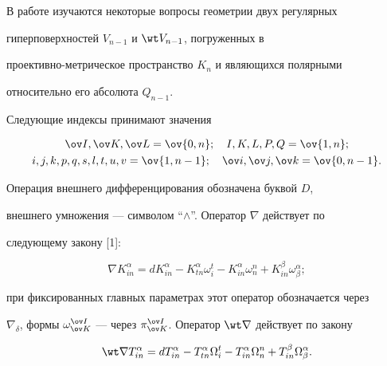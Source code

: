 \label{begin} 


 


 


В работе изучаются некоторые вопросы геометрии двух регулярных 


гиперповерхностей $V_{n-1}$ и $\wt V_{n-1}$, погруженных в 


проективно-метрическое пространство $K_n$ и являющихся полярными 


относительно его абсолюта $Q_{n-1}$. 


 


Следующие индексы принимают значения 


\begin{gather*} 


\ov I,\ov K,\ov L=\ov{0,n};\quad I,K,L,P,Q=\ov{1,n};\\ 


i,j,k,p,q,s,l,t,u,v=\ov{1,n-1};\quad 


\ov i,\ov j,\ov k=\ov{0,n-1}. 


\end{gather*} 


 


Операция внешнего дифференцирования обозначена буквой $D$, 


внешнего умножения --- символом ``$\wedge$''. Оператор $\nabla$ действует по 


следующему закону [1]: 


$$ 


\nabla K^\alpha_{in}=d K^\alpha_{in}-K^\alpha_{tn} 


\omega^t_i-K^\alpha_{in}\omega^n_n+K^\beta_{in} 


\omega^\alpha_\beta; 


$$ 


при фиксированных главных параметрах этот оператор обозначается через 


$\nabla_\delta$, формы $\omega^{\ov I}_{\ov K}$ --- через $\pi^{\ov I}_{\ov 


K}$. Оператор $\wt\nabla$ действует по закону 


$$ 


\wt\nabla T^\alpha_{in}=dT^\alpha_{in}-T^\alpha_{tn} 


\Omega^t_i-T^\alpha_{in}\Omega^n_n+T^\beta_{in} 


\Omega^\alpha_\beta. 


$$ 


